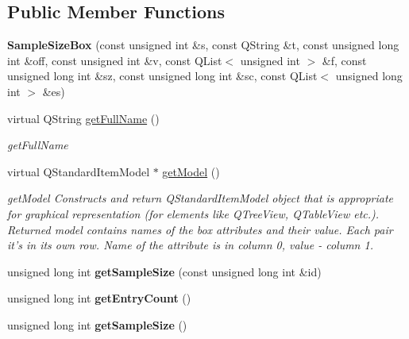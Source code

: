 \subsection*{Public Member Functions}
\begin{DoxyCompactItemize}
\item 
\hypertarget{class_sample_size_box_a10cc5ba42cfef014daccb0c5a9c45b37}{{\bfseries Sample\-Size\-Box} (const unsigned int \&s, const Q\-String \&t, const unsigned long int \&off, const unsigned int \&v, const Q\-List$<$ unsigned int $>$ \&f, const unsigned long int \&sz, const unsigned long int \&sc, const Q\-List$<$ unsigned long int $>$ \&es)}\label{class_sample_size_box_a10cc5ba42cfef014daccb0c5a9c45b37}

\item 
virtual Q\-String \hyperlink{class_sample_size_box_a3cdb87618bba15d0c9e8cea9dde19ee5}{get\-Full\-Name} ()
\begin{DoxyCompactList}\small\item\em get\-Full\-Name \end{DoxyCompactList}\item 
virtual Q\-Standard\-Item\-Model $\ast$ \hyperlink{class_sample_size_box_a4ca94df68b61aebbe2c3b46b18a8d5e5}{get\-Model} ()
\begin{DoxyCompactList}\small\item\em get\-Model Constructs and return Q\-Standard\-Item\-Model object that is appropriate for graphical representation (for elements like Q\-Tree\-View, Q\-Table\-View etc.). Returned model contains names of the box attributes and their value. Each pair it's in its own row. Name of the attribute is in column 0, value -\/ column 1. \end{DoxyCompactList}\item 
\hypertarget{class_sample_size_box_a753c55ac28d9657f267f71d3a60cb7fa}{unsigned long int {\bfseries get\-Sample\-Size} (const unsigned long int \&id)}\label{class_sample_size_box_a753c55ac28d9657f267f71d3a60cb7fa}

\item 
\hypertarget{class_sample_size_box_ad7bd6448c5e88893d8ccc575e8709e63}{unsigned long int {\bfseries get\-Entry\-Count} ()}\label{class_sample_size_box_ad7bd6448c5e88893d8ccc575e8709e63}

\item 
\hypertarget{class_sample_size_box_ab530c6f7d935372b1151790094d95188}{unsigned long int {\bfseries get\-Sample\-Size} ()}\label{class_sample_size_box_ab530c6f7d935372b1151790094d95188}

\end{DoxyCompactItemize}
